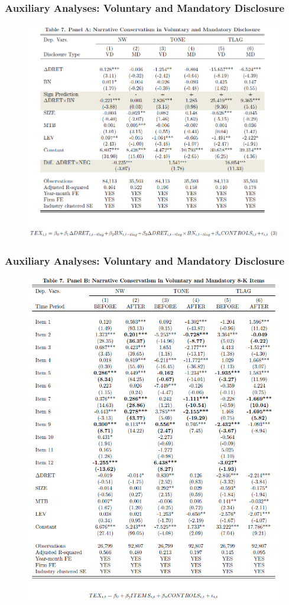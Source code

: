 \documentclass{beamer}
\begin{document}
\begin{frame}
\frametitle{Auxiliary Analyses: Voluntary and Mandatory Disclosure}
	\begin{figure}[h]
	\centering
	\includegraphics[width=0.75\linewidth]{tab7panA}
	\label{tab7panA}
	\end{figure}
	
\end{frame}
\begin{frame}
	\frametitle{Auxiliary Analyses: Voluntary and Mandatory Disclosure}
	\begin{figure}[h]
	\centering
	\includegraphics[width=0.48\linewidth]{tab7panB}
	\label{tab7panB}
	\end{figure}
	
\end{frame}
\end{document}
